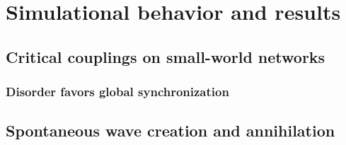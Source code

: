 \chapter{Simulational behavior and results}
\label{chap:simulations}

\section{Critical couplings on small-world networks}

\subsection{Disorder favors global synchronization}

\section{Spontaneous wave creation and annihilation}

